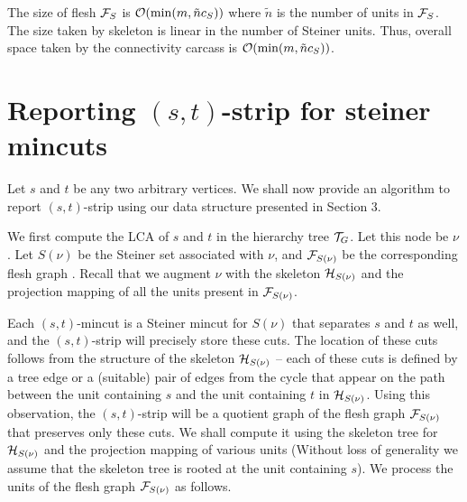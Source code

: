 The size of flesh ${\cal F}_S$ is ${\cal O}(\min(m,\tilde{n}c_S))$ where $\tilde{n}$ is the number of units in ${\cal F}_S$. The size taken by skeleton is linear in the number of Steiner units. Thus, overall space taken by the connectivity carcass is ${\cal O}(\min(m,\tilde{n}c_S))$.

\section{Reporting \texorpdfstring{$(s,t)$}{(s,t)}-strip for steiner mincuts} \label{appendix:xxx}

Let $s$ and $t$ be any two arbitrary vertices. We shall now provide an algorithm to report $(s,t)$-strip using our data structure presented in Section 3. 

We first compute the LCA of $s$ and $t$
in the hierarchy tree ${\cal T}_G$. Let this node be $\nu$. Let $S(\nu)$ be the Steiner set associated with $\nu$, and ${\cal F}_{S(\nu)}$ be the corresponding flesh graph . Recall that we augment $\nu$ with the skeleton ${\cal H}_{S(\nu)}$ and the projection mapping of all the units present in ${\cal F}_{S(\nu)}$.

Each $(s,t)$-mincut is a Steiner mincut for $S(\nu)$ that separates $s$ and $t$ as well, and the $(s,t)$-strip will precisely store these cuts. The location of these cuts follows from the structure of the skeleton ${\cal H}_{S(\nu)}$ -- each of these cuts is defined by a tree edge or a (suitable) pair of edges from the cycle that  appear on the path between the unit containing $s$ and the unit containing $t$ in ${\cal H}_{S(\nu)}$.
Using this observation, the $(s,t)$-strip will be a quotient graph of the flesh graph ${\cal F}_{S(\nu)}$ that preserves only these cuts. 
We shall compute it using the skeleton tree for ${\cal H}_{S(\nu)}$ and the projection mapping of various units
(Without loss of generality we assume that the skeleton tree is rooted at the unit containing $s$). We process the units of the flesh graph ${\cal F}_{S(\nu)}$ as follows.

